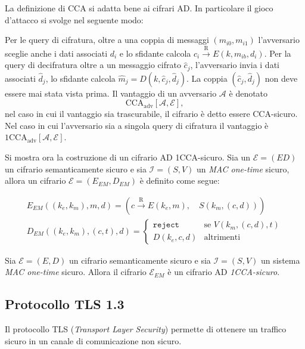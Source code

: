 \begin{definition}
    La definizione di CCA si adatta bene ai cifrari AD. In particolare il gioco d'attacco si svolge nel seguente modo:

    Per le query di cifratura, oltre a una coppia di messaggi $(m_{i0},m_{i1})$ l'avversario sceglie anche i dati associati $d_i$ e lo sfidante calcola $c_i \xrightarrow{\text{R}} E(k,m_{ib},d_i)$. Per la query di decifratura oltre a un messaggio cifrato $\hat{c}_j$, l'avversario invia i dati associati $\hat{d}_j$, lo sfidante calcola $\hat{m}_j = D(k,\hat{c}_j,\hat{d}_j)$. La coppia $(\hat{c}_j,\hat{d}_j)$ non deve essere mai stata vista prima. Il vantaggio di un avversario $\mathcal{A}$ è denotato
    \[
        \text{CCA}_{\text{adv}}[\mathcal{A},\mathcal{E}],
    \]
    nel caso in cui il vantaggio sia trascurabile, il cifrario è detto essere CCA-sicuro. Nel caso in cui l'avversario sia a singola query di cifratura il vantaggio è $\text{1CCA}_{\text{adv}}[\mathcal{A},\mathcal{E}]$.
\end{definition}

Si mostra ora la costruzione di un cifrario AD 1CCA-sicuro. Sia un $\mathcal{E} = (ED)$ un cifrario semanticamente sicuro e sia $\mathcal{I} = (S,V)$ un \emph{MAC one-time} sicuro, allora un cifrario $\mathcal{E} = (E_{EM},D_{EM})$ è definito come segue:

\begin{gather*}
    E_{EM}( (k_e,k_m),m,d) = ( c \xrightarrow{\text{R}} E(k_e,m), \quad S(k_m,(c,d)))\\
    D_{EM}((k_e,k_m),(c,t),d) = \begin{cases}
        \texttt{reject} & \text{se } V(k_m,(c,d),t)\\
        D(k_e,c,d) & \text{altrimenti}
    \end{cases}
\end{gather*}

\begin{theorem}
    Sia $\mathcal{E} = (E,D)$ un cifrario semanticamente sicuro e sia $\mathcal{I} = (S,V)$ un sistema \emph{MAC one-time} sicuro. Allora il cifrario $\mathcal{E}_{EM}$ è un cifrario AD \emph{1CCA-sicuro}.
\end{theorem}


\subsection{Protocollo TLS 1.3}
Il protocollo TLS (\emph{Transport Layer Security}) permette di ottenere un traffico sicuro in un canale di comunicazione non sicuro. 

